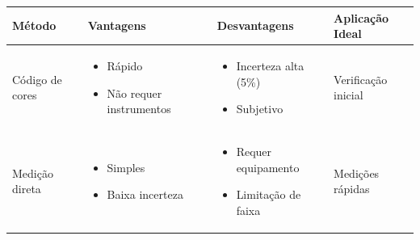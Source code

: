 \documentclass[12pt]{article}
\begin{document}
\begin{table}[H]
    \centering
    \begin{tabular}{@{}llll@{}}
        \toprule
        \textbf{Método} & \textbf{Vantagens} & \textbf{Desvantagens} & \textbf{Aplicação Ideal} \\
        \midrule
        Código de cores & 
        \begin{minipage}[t]{0.2\textwidth}
            \begin{itemize}
                \item Rápido
                \item Não requer instrumentos
            \end{itemize}
        \end{minipage} &
        \begin{minipage}[t]{0.25\textwidth}
            \begin{itemize}
                \item Incerteza alta (5\%)
                \item Subjetivo
            \end{itemize}
        \end{minipage} &
        Verificação inicial \\
        
        Medição direta & 
        \begin{minipage}[t]{0.2\textwidth}
            \begin{itemize}
                \item Simples
                \item Baixa incerteza
            \end{itemize}
        \end{minipage} &
        \begin{minipage}[t]{0.25\textwidth}
            \begin{itemize}
                \item Requer equipamento
                \item Limitação de faixa
            \end{itemize}
        \end{minipage} &
        Medições rápidas \\
        

\end{tabular}
\end{table}
\end{document}
